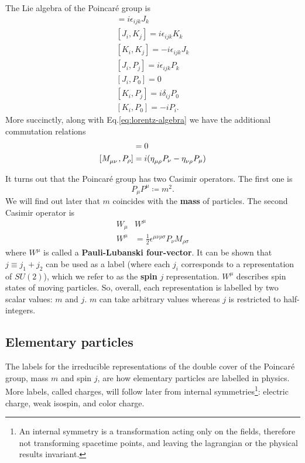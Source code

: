 \documentclass[11pt]{article}
\numberwithin{equation}{section}
\newcommand{\defeq}{\coloneqq}
\newcommand{\tn}[2]{\tensor{#1}{#2}}
\begin{document}
The Lie algebra of the Poincar\'{e} group is
\begin{align}
[J_i, J_j] = i \epsilon_{ijk}J_k \\
[J_i, K_j] = i \epsilon_{ijk} K_k \\
[K_i, K_j] = -i \epsilon_{ijk} J_k \\
[J_i, P_j] = i \epsilon_{ijk} P_k \\
[J_i, P_0] = 0 \\
[K_i, P_j] = i \delta_{ij} P_0 \\
[K_i, P_0] = -i P_i.
\end{align}
More succinctly, along with Eq.\eqref{eq:lorentz-algebra} we have the additional commutation relations
\begin{align}
[P_\mu, P_\nu] &= 0 \\
[\tn{M}{_\mu_\nu}, P_\rho] &= i (\tn{\eta}{_\mu_\rho} P_\nu - \tn{\eta}{_\nu_\rho}P_\mu)
\end{align}

It turns out that the Poincar\'{e} group has two Casimir operators. The first one is
\begin{equation}
P_\mu P^\mu \defeq m^2.
\end{equation}
We will find out later that $m$ coincides with the \textbf{mass} of particles. The second Casimir operator is
\begin{align}
W_\mu & W^\mu  \\
W^\mu &= \frac{1}{2} \epsilon^{\mu \nu \rho \sigma} P_\nu M_{\rho \sigma}
\end{align}
where $W^\mu$ is called a \textbf{Pauli-Lubanski four-vector}. It can be shown that $j \equiv j_1 + j_2$ can be used as a label (where each $j_i$ corresponds to a representation of $SU(2)$), which we refer to as the \textbf{spin} $j$ representation. $W^\mu$ describes spin states of moving particles. So, overall, each representation is labelled by two scalar values: $m$ and $j$. $m$ can take arbitrary values whereas $j$ is restricted to half-integers.

\subsection{Elementary particles}
The labels for the irreducible representations of the double cover of the Poincar\'{e} group, mass $m$ and spin $j$, are how elementary particles are labelled in physics. More labels, called charges, will follow later from internal symmetries\footnote{An internal symmetry is a transformation acting only on the fields, therefore not transforming spacetime points, and leaving the lagrangian or the physical results invariant.}: electric charge, weak isospin, and color charge. 
\end{document}
